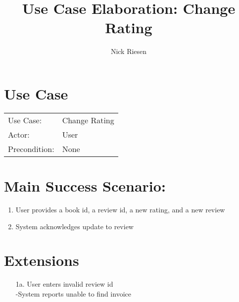 \documentclass{article}
\title{Use Case Elaboration: Change Rating}
\author{ Nick Riesen }
\begin{document}
\maketitle


\section*{Use Case}
\begin{tabular}{l l}
Use Case:     & Change Rating                 \\
Actor:        & User                          \\
Precondition: & None                          \\
\end{tabular}


\section*{Main Success Scenario:}

\begin{enumerate}
    \item  User provides a book id, a review id, a new rating, and a new review
    \item System acknowledges update to review

\end{enumerate}

\section*{Extensions}

\begin{itemize}
    \item [1a.] User enters invalid review id \\
        -System reports unable to find invoice

\end{itemize}
\end{document}
